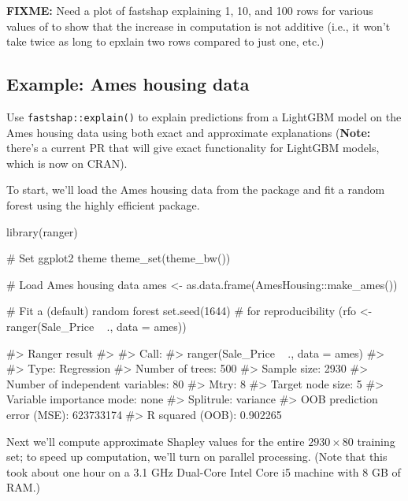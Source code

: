 \textbf{FIXME:} Need a plot of fastshap explaining 1, 10, and 100 rows
for various values of  to show that the increase in
computation is not additive (i.e., it won't take twice as long to
epxlain two rows compared to just one, etc.)

\hypertarget{example-ames-housing-data}{%
\subsection{Example: Ames housing
data}\label{example-ames-housing-data}}

Use \texttt{fastshap::explain()} to explain predictions from a LightGBM
model on the Ames housing data using both exact and approximate
explanations (\textbf{Note:} there's a current PR that will give exact
functionality for LightGBM models, which is now on CRAN).

To start, we'll load the Ames housing data from the
 package \citep{R-AmesHousing} and fit a random
forest using the highly efficient  \citep{R-ranger}
package.

\begin{Schunk}
\begin{Sinput}
library(ranger)

# Set ggplot2 theme
theme_set(theme_bw())

# Load Ames housing data
ames <- as.data.frame(AmesHousing::make_ames())

# Fit a (default) random forest
set.seed(1644)  # for reproducibility
(rfo <- ranger(Sale_Price ~ ., data = ames))
\end{Sinput}
\begin{Soutput}
#> Ranger result
#> 
#> Call:
#>  ranger(Sale_Price ~ ., data = ames) 
#> 
#> Type:                             Regression 
#> Number of trees:                  500 
#> Sample size:                      2930 
#> Number of independent variables:  80 
#> Mtry:                             8 
#> Target node size:                 5 
#> Variable importance mode:         none 
#> Splitrule:                        variance 
#> OOB prediction error (MSE):       623733174 
#> R squared (OOB):                  0.902265
\end{Soutput}
\end{Schunk}

Next we'll compute approximate Shapley values for the entire
\(2930 \times 80\) training set; to speed up computation, we'll turn on
parallel processing. (Note that this took about one hour on a 3.1 GHz
Dual-Core Intel Core i5 machine with 8 GB of RAM.)

